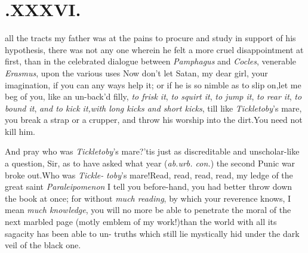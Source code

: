 \documentclass{article}
\begin{document}
\null
\section{.\quad  XXXVI.}

 all the tracts my father was at
the pains to procure and study in support of his hypothesis, there
was not any one wherein he felt a more cruel disappointment at
first, than in the celebrated dialogue between \textit{Pamphagus} and
\textit{Cocles}, 
venerable \textit{Erasmus}, upon the various uses
\tsh Now don’t let Satan, my dear girl, 
your imagination, if you can any ways help it; or if he is so
nimble as to slip on,\tsh let me beg of you, like an un-\break back’d
filly, \textit{to frisk it}, 
\textit{to squirt it}, 
\textit{to jump it}, 
\textit{to rear it}, 
\textit{to bound it},\tsh 
\textit{and to kick it,\break with long kicks and short
kicks}, till like \textit{Tickletoby}’s mare, you break a
strap\break
or a crupper, and throw his worship\break
into the dirt.\tsh You need not kill\break
him.\tsh

\tsk And pray who was \textit{Tickletoby}’s
mare?\tsk ’tis just as discreditable and un\-scholar-like a
question, Sir, as to have asked what year (\textit{ab.\@ urb.\@
con.})\@
the second Punic war broke out.\tsk Who was
\textit{Tickle-}
\textit{toby}’s mare!\tsk Read, read, read, read, my\break
{}
ledge of the great saint \textit{Paraleipomenon}\tsk\break
I tell you before-hand, you had better
throw down the book at once; for without
\textit{much reading}, by which
your reverence knows, I mean \textit{much knowledge}, you\break
will no more be able to penetrate the moral of the next marbled page 
(motly emblem
of my work!)\@ than the world with all its sagacity has been able to
un-\break
{}\break
truths which still lie
mystically hid under the dark veil of the black
one.
\end{document}
